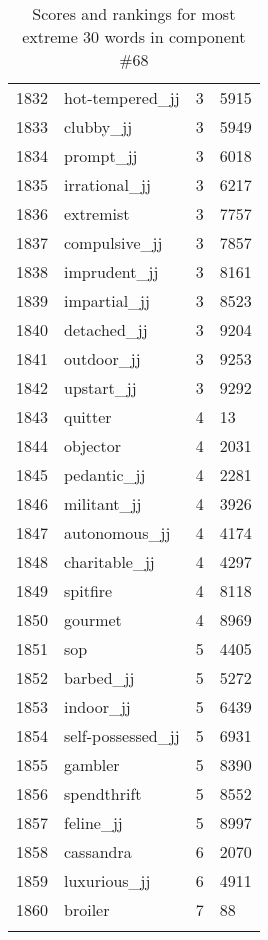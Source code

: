 \begin{longtable}[!htbp]{| rlr@{.}l |}
    1832 & hot-tempered\_jj & 3 & 5915 \\
    1833 & clubby\_jj & 3 & 5949 \\
    1834 & prompt\_jj & 3 & 6018 \\
    1835 & irrational\_jj & 3 & 6217 \\
    1836 & extremist & 3 & 7757 \\
    1837 & compulsive\_jj & 3 & 7857 \\
    1838 & imprudent\_jj & 3 & 8161 \\
    1839 & impartial\_jj & 3 & 8523 \\
    1840 & detached\_jj & 3 & 9204 \\
    1841 & outdoor\_jj & 3 & 9253 \\
    1842 & upstart\_jj & 3 & 9292 \\
    1843 & quitter & 4 & 13 \\
    1844 & objector & 4 & 2031 \\
    1845 & pedantic\_jj & 4 & 2281 \\
    1846 & militant\_jj & 4 & 3926 \\
    1847 & autonomous\_jj & 4 & 4174 \\
    1848 & charitable\_jj & 4 & 4297 \\
    1849 & spitfire & 4 & 8118 \\
    1850 & gourmet & 4 & 8969 \\
    1851 & sop & 5 & 4405 \\
    1852 & barbed\_jj & 5 & 5272 \\
    1853 & indoor\_jj & 5 & 6439 \\
    1854 & self-possessed\_jj & 5 & 6931 \\
    1855 & gambler & 5 & 8390 \\
    1856 & spendthrift & 5 & 8552 \\
    1857 & feline\_jj & 5 & 8997 \\
    1858 & cassandra & 6 & 2070 \\
    1859 & luxurious\_jj & 6 & 4911 \\
    1860 & broiler & 7 & 88 \\
    \hline
    \caption{Scores and rankings for most extreme 30 words in component \#68} \\
\end{longtable}

